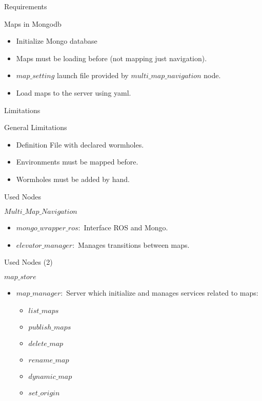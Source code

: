 \documentclass[14pt]{beamer}
\begin{document}
\begin{frame}{Requirements}
    \begin{alertblock}{Maps in Mongodb}
        \begin{itemize}
            \item Initialize Mongo database
        		\item Maps must be loading before (not mapping just navigation).
            \item $map\_setting$ launch file provided by $multi\_map\_navigation$ node.
            \item Load maps to the server using yaml.
		\end{itemize}       
	\end{alertblock}
\end{frame}

\begin{frame}{Limitations}
    \begin{alertblock}{General Limitations}
        \begin{itemize}
            \item Definition File with declared wormholes.
            \item Environments must be mapped before.
            \item Wormholes must be added by hand.
        \end{itemize}
    \end{alertblock}
\end{frame}

\begin{frame}{Used Nodes}
    \begin{alertblock}{$Multi\_Map\_Navigation$}
        \begin{itemize}
        \item $mongo\_wrapper\_ros: $ Interface ROS and Mongo.
        \item $elevator\_manager:$ Manages transitions between maps.
        \end{itemize}
    \end{alertblock}
\end{frame}

\begin{frame}{Used Nodes (2)}
    \begin{alertblock}{$map\_store$}
        \begin{itemize}
        		\item $map\_manager:$ Server which initialize and manages services related to maps:
        		\begin{itemize}
        			\item $list\_maps$
        			\item $publish\_maps$
        			\item $delete\_map$
        			\item $rename\_map$
        			\item $dynamic\_map$
        			\item $set\_origin$
        		\end{itemize}
        \end{itemize}
    \end{alertblock}
\end{frame}
\end{document}
